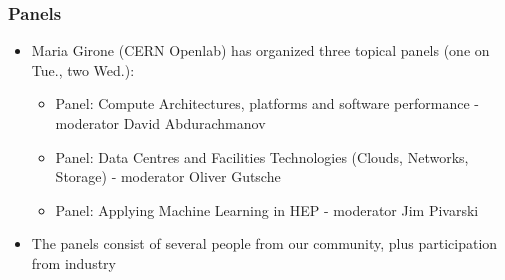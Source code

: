 \begin{frame}
\frametitle{Panels}

\begin{itemize}
\item Maria Girone (CERN Openlab) has organized three topical panels (one on Tue., two Wed.):
  \begin{itemize}
  \item Panel: Compute Architectures, platforms and software performance - moderator David Abdurachmanov
  \item Panel: Data Centres and Facilities Technologies (Clouds, Networks, Storage) - moderator Oliver Gutsche
  \item Panel: Applying Machine Learning in HEP - moderator Jim Pivarski
  \end{itemize}
\item The panels consist of several people from our community, plus participation from industry
\end{itemize}

\end{frame}


